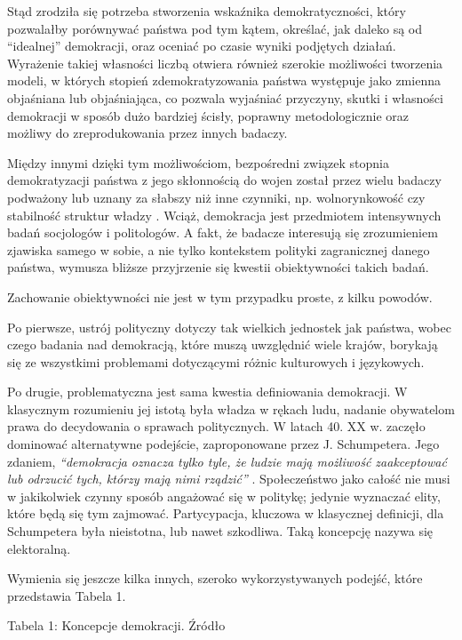 \documentclass[12pt]{article}
\begin{document}
Stąd zrodziła się potrzeba stworzenia wskaźnika demokratyczności, który pozwalałby porównywać państwa pod tym kątem, określać, jak daleko są od ``idealnej'' demokracji, oraz oceniać po czasie wyniki podjętych działań. Wyrażenie takiej własności liczbą otwiera również szerokie możliwości tworzenia modeli, w których stopień zdemokratyzowania państwa występuje jako zmienna objaśniana lub objaśniająca, co pozwala wyjaśniać przyczyny, skutki i własności demokracji w sposób dużo bardziej ścisły, poprawny metodologicznie oraz możliwy do zreprodukowania przez innych badaczy.

Między innymi dzięki tym możliwościom, bezpośredni związek stopnia demokratyzacji państwa z jego skłonnością do wojen został przez wielu badaczy podważony lub uznany za słabszy niż inne czynniki, np. wolnorynkowość czy stabilność struktur władzy \citep{Doorenspleet}. Wciąż, demokracja jest przedmiotem intensywnych badań socjologów i politologów. A fakt, że badacze interesują się zrozumieniem zjawiska samego w sobie, a nie tylko kontekstem polityki zagranicznej danego państwa, wymusza bliższe przyjrzenie się kwestii obiektywności takich badań.

Zachowanie obiektywności nie jest w tym przypadku proste, z kilku powodów.

Po pierwsze, ustrój polityczny dotyczy tak wielkich jednostek jak państwa, wobec czego badania nad demokracją, które muszą uwzględnić wiele krajów, borykają się ze wszystkimi problemami dotyczącymi różnic kulturowych i językowych.

Po drugie, problematyczna jest sama kwestia definiowania demokracji. W klasycznym rozumieniu jej istotą była władza w rękach ludu, nadanie obywatelom prawa do decydowania o sprawach politycznych. W latach 40. XX w. zaczęło dominować alternatywne podejście, zaproponowane przez J. Schumpetera. Jego zdaniem, \emph{``demokracja oznacza tylko tyle, że ludzie mają możliwość zaakceptować lub odrzucić tych, którzy mają nimi rządzić''} \citep{Schumpeter}. Społeczeństwo jako całość nie musi w jakikolwiek czynny sposób angażować się w politykę; jedynie wyznaczać elity, które będą się tym zajmować. Partycypacja, kluczowa w klasycznej definicji, dla Schumpetera była nieistotna, lub nawet szkodliwa. Taką koncepcję nazywa się elektoralną.

Wymienia się jeszcze kilka innych, szeroko wykorzystywanych podejść, które przedstawia Tabela 1.

Tabela 1: Koncepcje demokracji. Źródło \citep{Coppedge}
\end{document}
